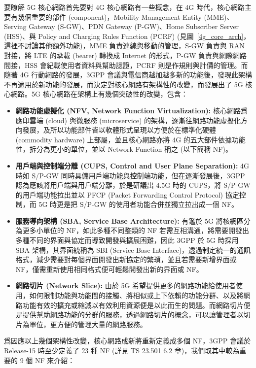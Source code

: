 要瞭解 5G 核心網路首先要對 4G 核心網路有一些概念，在 4G 時代，核心網路主要有幾個重要的部件 (component)，Mobility Management Entity (MME)、Serving Gateway (S-GW)、PDN Gateway (P-GW)、Home Subscriber Server (HSS)、與 Policy and Charging Rules Function (PCRF) (見圖~\ref{4g_core_arch}，這裡不討論其他額外功能)，MME 負責連線與移動的管理，S-GW 負責與 RAN 對接，將 LTE 的承載 (bearer) 轉換成 Internet 的形式，P-GW 負責與網際網路間接，HSS 會紀載使用者資料與幫助認證，PCRF 則是作規則與計價的管理。而隨著 4G 行動網路的發展，3GPP 會議與電信商越加越多新的功能後，發現此架構不再適用於新功能的發展，而決定對核心網路有架構性的改變，而發展出了 5G 核心網路。5G 核心網路在架構上有幾個突破性的改變，包含：
\begin{itemize}
    \item \textbf{網路功能虛擬化 (NFV, Network Function Virtualization):} 核心網路爲應印雲端 (cloud) 與微服務 (microservice) 的架構，逐漸往網路功能虛擬化方向發展，及所以功能部件皆以軟體形式呈現以方便於在標準化硬體 (commodity hardware) 上部屬，並且核心網路亦將 4G 的五大部件依據功能性，拆分為更小的單位，並以 Network Function 稱之 (以下簡稱 NF)。
    \item \textbf{用戶端與控制端分離 (CUPS, Control and User Plane Separation):} 4G 時如 S/P-GW 同時具備用戶端功能與控制端功能，但在逐漸發展後，3GPP 認為應該將用戶端與用戶端分離，於是研議出 4.5G 時的 CUPS，將 S/P-GW 的用戶端功能拉出並以 PFCP (Packet Forwarding Control Protocol) 協定控制，而 5G 時更是把 S/P-GW 的使用者功能合併並獨立拉出成一個 NF。
    \item \textbf{服務導向架構 (SBA, Service Base Architecture):} 有鑑於 5G 將核網區分為更多小單位的 NF，如此多種不同整類的 NF 若需互相溝通，將需要開發出多種不同的界面與協定而導致開發與擴展困難，因此 3GPP 於 5G 時採用 SBA 架構，其界面統稱為 SBI (Service Base Interface)，透過制定統一的通訊格式，減少需要對每個界面開發出新協定的繁瑣，並且若需要新增界面或 NF，僅需重新使用相同格式便可輕鬆開發出新的界面或 NF。
    \item \textbf{網路切片 (Network Slice):} 由於 5G 希望提供更多的網路功能給使用者使用，如何限制功能與功能間的接觸、將相似或上下依賴的功能分群、以及將網路功能有效的擴充或縮減以有效利用資源便是以此而生的問題。而網路切片便是提供幫助網路功能的分群的服務，透過網路切片的概念，可以讓管理者以切片為單位，更方便的管理大量的網路服務。
\end{itemize}



爲因應以上幾個架構性改變，核心網路成新將重新定義成多個 NF，3GPP 會議於 Release-15 時至少定義了 23 種 NF (詳見 TS 23.501 6.2 章)，我們取其中較為重要的 9 個 NF 來介紹：

